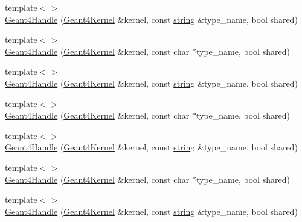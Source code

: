 \begin{DoxyCompactItemize}
\item 
{\footnotesize template$<$$>$ }\\\hyperlink{class_d_d4hep_1_1_simulation_1_1_geant4_handle_ac0b529aeedcc63eefc998a3b465f42c3}{Geant4Handle} (\hyperlink{class_d_d4hep_1_1_simulation_1_1_geant4_kernel}{Geant4Kernel} \&kernel, const \hyperlink{classstd_1_1string}{string} \&type\_\-name, bool shared)
\item 
{\footnotesize template$<$$>$ }\\\hyperlink{class_d_d4hep_1_1_simulation_1_1_geant4_handle_a2ded3d6903b5cba4fe1b07ff4154871c}{Geant4Handle} (\hyperlink{class_d_d4hep_1_1_simulation_1_1_geant4_kernel}{Geant4Kernel} \&kernel, const char $\ast$type\_\-name, bool shared)
\item 
{\footnotesize template$<$$>$ }\\\hyperlink{class_d_d4hep_1_1_simulation_1_1_geant4_handle_ae6410e60af2369a411dbf50b5aad0c83}{Geant4Handle} (\hyperlink{class_d_d4hep_1_1_simulation_1_1_geant4_kernel}{Geant4Kernel} \&kernel, const \hyperlink{classstd_1_1string}{string} \&type\_\-name, bool shared)
\item 
{\footnotesize template$<$$>$ }\\\hyperlink{class_d_d4hep_1_1_simulation_1_1_geant4_handle_aa6e659182a031473d945668f9fac0659}{Geant4Handle} (\hyperlink{class_d_d4hep_1_1_simulation_1_1_geant4_kernel}{Geant4Kernel} \&kernel, const char $\ast$type\_\-name, bool shared)
\item 
{\footnotesize template$<$$>$ }\\\hyperlink{class_d_d4hep_1_1_simulation_1_1_geant4_handle_a6a36ee9cdcf7791b090f056f08f0075e}{Geant4Handle} (\hyperlink{class_d_d4hep_1_1_simulation_1_1_geant4_kernel}{Geant4Kernel} \&kernel, const \hyperlink{classstd_1_1string}{string} \&type\_\-name, bool shared)
\item 
{\footnotesize template$<$$>$ }\\\hyperlink{class_d_d4hep_1_1_simulation_1_1_geant4_handle_af91d192bb9b5720390e823ae31838c8a}{Geant4Handle} (\hyperlink{class_d_d4hep_1_1_simulation_1_1_geant4_kernel}{Geant4Kernel} \&kernel, const char $\ast$type\_\-name, bool shared)
\item 
{\footnotesize template$<$$>$ }\\\hyperlink{class_d_d4hep_1_1_simulation_1_1_geant4_handle_a436ab2989350f1b7b5400284bf3dcc4e}{Geant4Handle} (\hyperlink{class_d_d4hep_1_1_simulation_1_1_geant4_kernel}{Geant4Kernel} \&kernel, const \hyperlink{classstd_1_1string}{string} \&type\_\-name, bool shared)

\end{DoxyCompactItemize}
